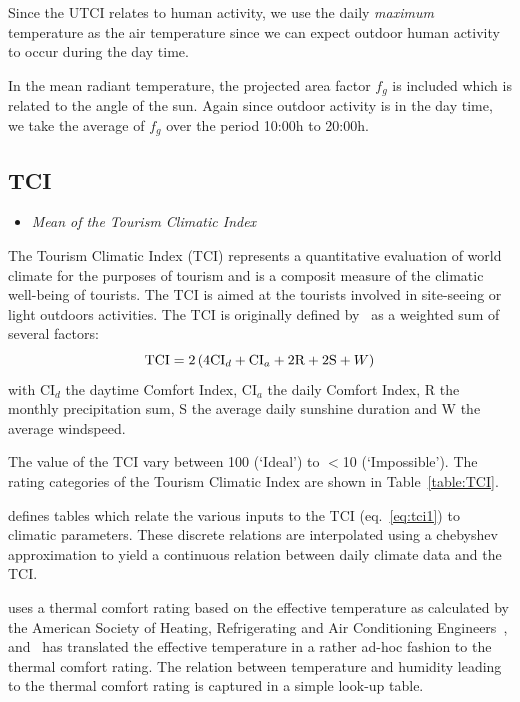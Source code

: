 \documentclass[a4paper,11pt]{article}
\begin{document}
Since the UTCI relates to human activity, we use the daily
\emph{maximum} temperature as the air temperature since we can expect outdoor human activity to occur
during the day time.

In the mean radiant temperature, the projected area factor $f_g$ is included
which is related to the angle of the sun. Again since outdoor activity is in the day time, we take the
average of $f_g$ over the period 10:00h to 20:00h.

\subsection*{TCI}
\begin{itemize}
\item \textit{Mean of the Tourism Climatic Index}
\end{itemize}
The Tourism Climatic Index (TCI) represents a quantitative evaluation
of world climate for the purposes of tourism and is a composit
measure of the climatic well-being of tourists. 
The TCI is aimed at the tourists involved in site-seeing or light outdoors activities. 
The TCI is originally defined by~\citet{mieczkowski:85} as a weighted sum of several factors:
\begin{equation} \label{eq:tci1}
\text{TCI} = 2 \left( 4 \text{CI}_d + \text{CI}_a + 2 \text{R} + 2 \text{S} + W \right) \notag
\end{equation}
with CI$_d$ the daytime Comfort Index, CI$_a$ the daily Comfort Index, R the monthly precipitation sum,
S the average daily sunshine duration and W the average windspeed. 

The value of the TCI vary between 100 (`Ideal') to $<$10 (`Impossible'). The rating categories of the
Tourism Climatic Index are shown in Table~\ref{table:TCI}.

\citet{mieczkowski:85} defines tables which relate the various inputs to the TCI (eq.~\ref{eq:tci1}) to
climatic parameters. These discrete relations are interpolated using a chebyshev approximation to yield
a continuous relation between daily climate data and the TCI. 

\citet{mieczkowski:85} uses a thermal comfort rating based on the effective temperature as
calculated by the American Society of Heating, Refrigerating and Air Conditioning Engineers~\citep{ashrae:72},
and~\citet{mieczkowski:85} has translated
the effective temperature in a rather ad-hoc fashion to the thermal comfort rating. The relation
between temperature and humidity leading to the thermal comfort rating is captured in a simple
look-up table.
\end{document}

